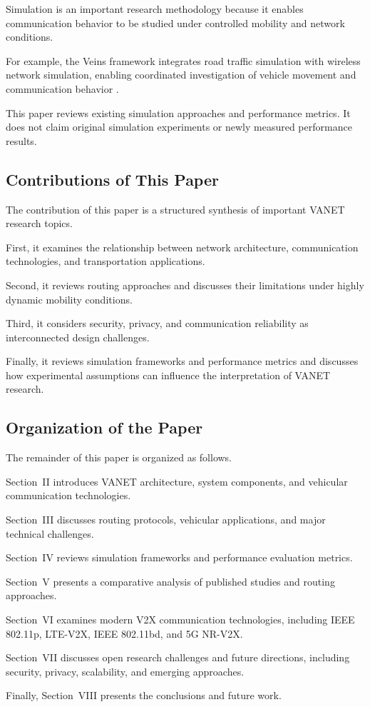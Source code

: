 Simulation is an important
research methodology
because it enables
communication behavior
to be studied under
controlled mobility
and network conditions.

For example, the Veins
framework integrates
road traffic simulation
with wireless network
simulation, enabling
coordinated investigation
of vehicle movement
and communication
behavior \cite{Sommer2011}.

This paper reviews
existing simulation
approaches and
performance metrics.
It does not claim
original simulation
experiments or
newly measured
performance results.

\subsection{Contributions of This Paper}

The contribution of
this paper is a
structured synthesis
of important VANET
research topics.

First, it examines
the relationship
between network
architecture,
communication
technologies,
and transportation
applications.

Second, it reviews
routing approaches
and discusses their
limitations under
highly dynamic
mobility conditions.

Third, it considers
security, privacy,
and communication
reliability as
interconnected
design challenges.

Finally, it reviews
simulation frameworks
and performance metrics
and discusses how
experimental assumptions
can influence the
interpretation of
VANET research.

\subsection{Organization of the Paper}

The remainder of this paper is organized
as follows.

Section~II introduces VANET architecture,
system components, and vehicular
communication technologies.

Section~III discusses routing protocols,
vehicular applications, and major
technical challenges.

Section~IV reviews simulation frameworks
and performance evaluation metrics.

Section~V presents a comparative analysis
of published studies and routing approaches.

Section~VI examines modern V2X communication
technologies, including IEEE 802.11p,
LTE-V2X, IEEE 802.11bd, and 5G NR-V2X.

Section~VII discusses open research
challenges and future directions,
including security, privacy,
scalability, and emerging approaches.

Finally, Section~VIII presents the
conclusions and future work.
